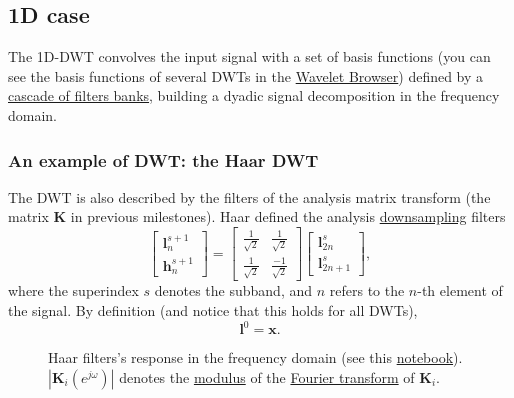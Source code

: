 \subsection{1D case}

The 1D-DWT convolves the input signal with a set of basis functions
(you can see the basis functions of several DWTs in the
\href{http://wavelets.pybytes.com/}{Wavelet Browser}) defined by a
\href{https://tecnologias-multimedia.github.io/milestones/12-temporal_coding/}{cascade
  of filters banks}, building a dyadic signal decomposition in the
frequency domain.

\subsubsection{An example of DWT: the Haar DWT}
The DWT is also described by the filters of
the analysis matrix transform (the matrix ${\mathbf K}$ in previous
  milestones). Haar defined the analysis
\href{https://en.wikipedia.org/wiki/Downsampling_(signal_processing)}{downsampling}
filters
\begin{equation}
  \begin{bmatrix}
    {\mathbf l}^{s+1}_n \\
    {\mathbf h}^{s+1}_n
  \end{bmatrix}
  = 
  \begin{bmatrix} \frac{1}{\sqrt{2}} & \frac{1}{\sqrt{2}} \\ \frac{1}{\sqrt{2}} & \frac{-1}{\sqrt{2}} \end{bmatrix}
  \begin{bmatrix}
    {\mathbf l}^s_{2n} \\
    {\mathbf l}^s_{2n+1}
  \end{bmatrix},
  \label{eq:Haar_transform}
\end{equation}
where the superindex $s$ denotes the subband, and $n$ refers to the
$n$-th element of the signal. By definition (and notice that this
holds for all DWTs),
\begin{equation}
  {\mathbf l}^0={\mathbf x}.
\end{equation}

\begin{figure}
  \centering
  \caption{Haar filters's response in the frequency domain (see this
    \href{https://github.com/Sistemas-Multimedia/Sistemas-Multimedia.github.io/blob/master/milestones/08-DWT/DWT_filters_analysis.ipynb}{notebook}).
    $|{\mathbf K}_i(e^{j\omega})|$ denotes the
    \href{https://en.wikipedia.org/wiki/Absolute_value}{modulus} of
    the \href{https://en.wikipedia.org/wiki/Fourier_transform}{Fourier
      transform} of ${\mathbf K}_i$.}
  \label{fig:Haar_modulus}
\end{figure}

